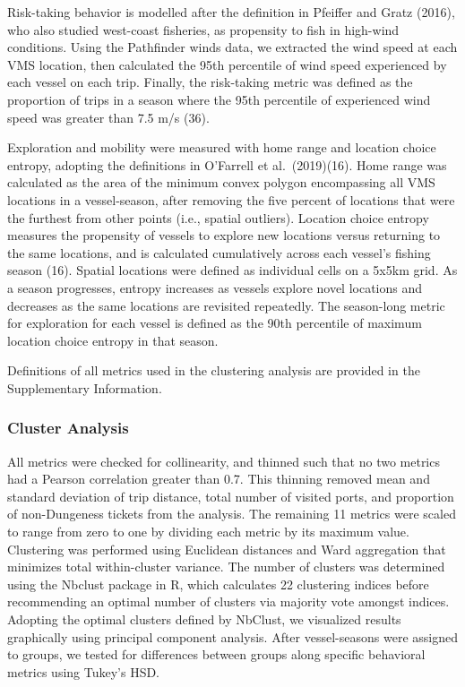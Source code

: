 \documentclass[9pt,twocolumn,twoside,lineno]{pnas-new}
\begin{document}
Risk-taking behavior is modelled after the definition in Pfeiffer and
Gratz (2016), who also studied west-coast fisheries, as propensity to
fish in high-wind conditions. Using the Pathfinder winds data, we
extracted the wind speed at each VMS location, then calculated the 95th
percentile of wind speed experienced by each vessel on each trip.
Finally, the risk-taking metric was defined as the proportion of trips
in a season where the 95th percentile of experienced wind speed was
greater than 7.5 m/s (36).

Exploration and mobility were measured with home range and location
choice entropy, adopting the definitions in O'Farrell et al.~(2019)(16).
Home range was calculated as the area of the minimum convex polygon
encompassing all VMS locations in a vessel-season, after removing the
five percent of locations that were the furthest from other points
(i.e., spatial outliers). Location choice entropy measures the
propensity of vessels to explore new locations versus returning to the
same locations, and is calculated cumulatively across each vessel's
fishing season (16). Spatial locations were defined as individual cells
on a 5x5km grid. As a season progresses, entropy increases as vessels
explore novel locations and decreases as the same locations are
revisited repeatedly. The season-long metric for exploration for each
vessel is defined as the 90th percentile of maximum location choice
entropy in that season.

Definitions of all metrics used in the clustering analysis are provided
in the Supplementary Information.

\hypertarget{cluster-analysis}{%
\subsubsection*{Cluster Analysis}\label{cluster-analysis}}

All metrics were checked for collinearity, and thinned such that no two
metrics had a Pearson correlation greater than 0.7. This thinning
removed mean and standard deviation of trip distance, total number of
visited ports, and proportion of non-Dungeness tickets from the
analysis. The remaining 11 metrics were scaled to range from zero to one
by dividing each metric by its maximum value. Clustering was performed
using Euclidean distances and Ward aggregation that minimizes total
within-cluster variance. The number of clusters was determined using the
Nbclust package in R, which calculates 22 clustering indices before
recommending an optimal number of clusters via majority vote amongst
indices. Adopting the optimal clusters defined by NbClust, we visualized
results graphically using principal component analysis. After
vessel-seasons were assigned to groups, we tested for differences
between groups along specific behavioral metrics using Tukey's HSD.
\end{document}
